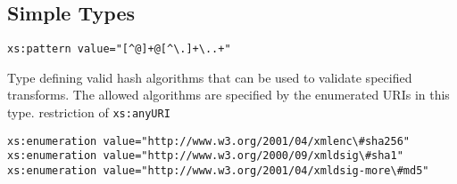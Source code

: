 \newcommand{\complexTypeCWA}[5]{
    \subsubsection{\textbf{ {\texttt{#1}} }}
    
    \textbf{Description:}
    \begin{adjustwidth}{5mm}{} \vspace{-1.5mm}
        #2
    \end{adjustwidth}
    
    \textbf{Base Type:}
    \begin{adjustwidth}{5mm}{} \vspace{-1.5mm}
        #3
    \end{adjustwidth}
    
    \textbf{Children:}
    \begin{adjustwidth}{5mm}{} \vspace{-1.5mm}
        \texttt{#4}
    \end{adjustwidth}
    
    \textbf{Attributes:}
    \begin{adjustwidth}{5mm}{} \vspace{-1.5mm}
        \texttt{#5}
    \end{adjustwidth}
}


\subsection{Simple Types}

            
            \begin{adjustwidth}{5mm}{}            
                \lstinline{xs:pattern value="[^@]+@[^\.]+\..+"}
            \end{adjustwidth}

            {Type defining valid hash algorithms that can be used to validate specified transforms.  The allowed algorithms are specified by the enumerated URIs in this type.}
            {restriction of \texttt{xs:anyURI}}
                
            \begin{adjustwidth}{5mm}{}            
                \lstinline{xs:enumeration value="http://www.w3.org/2001/04/xmlenc\#sha256"} \\
                \lstinline{xs:enumeration value="http://www.w3.org/2000/09/xmldsig\#sha1"} \\
                \lstinline{xs:enumeration value="http://www.w3.org/2001/04/xmldsig-more\#md5"}
            \end{adjustwidth}

